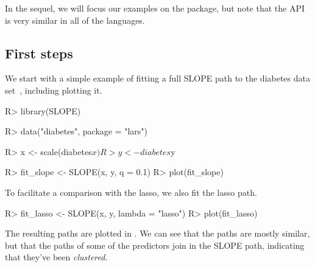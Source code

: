 \documentclass[article]{jss}
\let\Cref\crtCref
\begin{document}
In the sequel, we will focus our examples on the  package, but
note that the API is very similar in all of the languages.

\subsection{First steps}

We start with a simple example of fitting a full SLOPE path to the diabetes
data set~\citep{efron2004}, including plotting it.

\begin{Code}
R> library(SLOPE)

R> data("diabetes", package = "lars")
 
R> x <- scale(diabetes$x)
R> y <- diabetes$y
 
R> fit_slope <- SLOPE(x, y, q = 0.1)
R> plot(fit_slope)
\end{Code}

To facilitate a comparison with the lasso,
we also fit the lasso path.

\begin{Code}
R> fit_lasso <- SLOPE(x, y, lambda = "lasso")
R> plot(fit_lasso)
\end{Code}

The resulting paths are plotted in \Cref{fig:diabetes}.
We can see that the paths are mostly
similar, but that the paths of some
of the predictors join in the SLOPE
path, indicating that they've been
\emph{clustered}.
\end{document}
